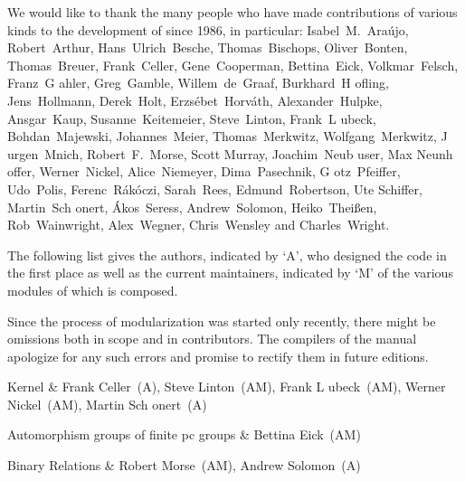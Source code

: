 

{\obeylines%
We would like to thank the many people who have made contributions of
various kinds to the development of {\GAP} since 1986, in particular:
\medskip
Isabel~M.~Ara{\'u}jo, Robert~Arthur, Hans~Ulrich~Besche, Thomas~Bischops,
Oliver~Bonten, Thomas~Breuer, Frank~Celler, Gene~Cooperman, Bettina~Eick,
Volkmar~Felsch, Franz~G{ a}hler, Greg~Gamble, Willem~de~Graaf,
Burkhard~H{ o}fling, Jens~Hollmann, Derek~Holt, Erzs{\'e}bet~Horv{\'a}th, 
Alexander~Hulpke, Ansgar~Kaup, Susanne~Keitemeier, Steve~Linton,
Frank~L{ u}beck, Bohdan~Majewski, Johannes~Meier, Thomas~Merkwitz, 
Wolfgang~Merkwitz, J{ u}rgen~Mnich, Robert~F.~Morse, Scott Murray, 
Joachim~Neub{ u}ser, Max Neunh{ o}ffer, Werner~Nickel, 
Alice~Niemeyer, Dima~Pasechnik, G{ o}tz~Pfeiffer, Udo~Polis,
Ferenc~R{\'a}k{\'o}czi, Sarah~Rees, Edmund~Robertson, Ute Schiffer, 
Martin~Sch{ o}nert, {\'A}kos~Seress, Andrew~Solomon, 
Heiko~Thei{\ss}en, Rob~Wainwright, Alex~Wegner, Chris~Wensley and Charles~Wright.
}%
\bigskip \bigskip \bigskip

The following list gives the authors, indicated by `A', who designed the code in the first
place as well as the current maintainers, indicated by `M' of the various modules of which
{\GAP} is composed.

Since the process of modularization was started only recently, there might
be omissions both in scope and in contributors.  The compilers of the
manual apologize for any such errors and promise to rectify them in future
editions.

\hfuzz=5pt%

\beginitems
Kernel & 
Frank Celler~(A), Steve Linton~(AM), Frank L{ u}beck~(AM), 
Werner Nickel~(AM), Martin Sch{ o}nert~(A)

Automorphism groups of finite pc groups &
Bettina Eick~(AM)

Binary Relations &
Robert Morse~(AM), Andrew Solomon~(A) 

